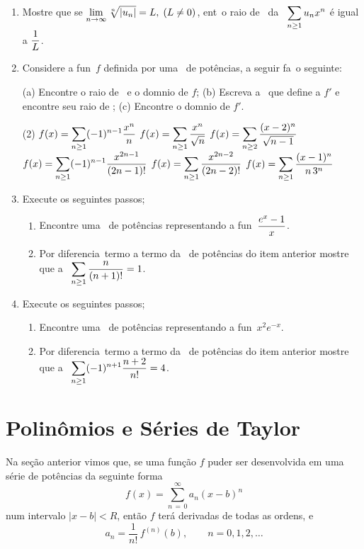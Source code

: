 \begin{enumerate}[label=(\arabic*)]
\item Mostre que se $\displaystyle{\lim_{n\to \infty }\sqrt[n]{|u_n|}=L},\; (L\not= 0)$, ent\ao\ o raio de \conv\  da \ser\ $\displaystyle{\sum_{n\geq 1}u_n x^{n}}$ \'e igual a $\displaystyle{\frac{1}{L}}$.

\item Considere a fun\cao\ $f$ definida por uma \ser\ de pot\^encias, a seguir fa\ca\ o seguinte:

(a) Encontre o raio de \conv\ e o dom\ii nio de $f$; (b) Escreva a \ser\ que define a $f'$ e encontre seu raio de
\conv; (c) Encontre o dom\ii nio de $f'$.
\begin{tasks}[label=(\roman*),label-width=2em,ref=(\alph*)](2)
 \task \(f(x)=\displaystyle\sum_{n\geq 1}(-1)^{n-1}\dfrac{x^n}{n} \)
 \task \(f(x)=\displaystyle \sum_{n\geq 1}\dfrac{x^n}{\sqrt{n}}\)
 \task \(f(x)=\displaystyle \sum_{n\geq 2}\dfrac{(x-2)^n}{\sqrt{n-1}}\)
 \task \(f(x)=\displaystyle \sum_{n\geq 1}(-1)^{n-1}\dfrac{x^{2n-1}}{(2n-1)!}\)
 \task \(f(x)=\displaystyle \sum_{n\geq 1}\dfrac{x^{2n-2}}{(2n-2)!}\)
 \task \(f(x)=\displaystyle \sum_{n\geq 1}\dfrac{(x-1)^n}{n\,3^n}\)
\end{tasks}

\item Execute os seguintes passos;
\begin{enumerate}
\item Encontre uma \ser\ de pot\^encias representando a fun\cao\ $\displaystyle{\frac{e^{x}-1}{x}}$.
\item Por diferencia\cao\ termo a termo da \ser\ de pot\^encias do
item anterior mostre que  a \ser\ $\displaystyle{\sum_{n\geq
1}\frac{n}{(n+1)!}=1}$.
\end{enumerate}
\item Execute os seguintes passos;
\begin{enumerate}
\item Encontre uma \ser\ de pot\^encias representando a fun\cao\ $x^2 e^{-x}$.
\item Por diferencia\cao\ termo a termo da \ser\ de pot\^encias do
item anterior mostre que  a \ser\ $\displaystyle{\sum_{n\geq
1}(-1)^{n+1}\frac{n+2}{n!}=4}$.
\end{enumerate}
\end{enumerate}

\section{Polinômios e Séries de Taylor}
Na seção anterior vimos que, se uma função $f$ puder ser desenvolvida em uma série de potências da seguinte forma
\begin{equation*}
  f(x) = \sum_{n\, =\, 0}^{\infty}a_n(x - b)^n
\end{equation*}
num intervalo $|x - b| < R$, então $f$ terá derivadas de todas as ordens, e
\begin{equation*}
  a_n= \frac{1}{n!}\,f^{(n)}(b),\qquad  n = 0, 1, 2, \ldots
\end{equation*}

